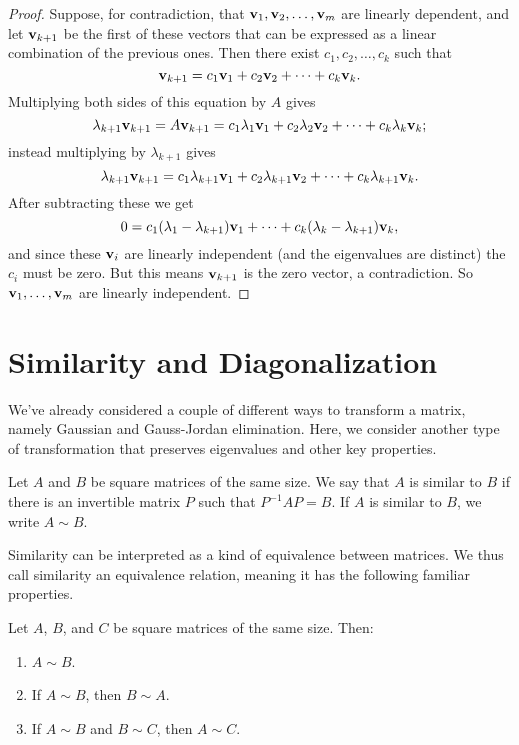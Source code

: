 \documentclass[../m073main.tex]{subfiles}
\begin{document}
\begin{proof}
	Suppose, for contradiction, that $\mathbf{v}_1, \mathbf{v}_2, \ldots, \mathbf{v}_m$ are linearly dependent, and let $\mathbf{v}_{k+1}$ be the first of these vectors that can be expressed as a linear combination of the previous ones.
	Then there exist $c_1, c_2, \ldots, c_k$ such that
	\[ \mathbf{v}_{k+1} = c_1 \mathbf{v}_1 + c_2 \mathbf{v}_2 + \cdots + c_k \mathbf{v}_k. \]
	Multiplying both sides of this equation by $A$ gives
	\[ \lambda_{k+1} \mathbf{v}_{k+1} = A \mathbf{v}_{k+1} = c_1 \lambda_1 \mathbf{v}_1 + c_2 \lambda_2 \mathbf{v}_2 + \cdots + c_k \lambda_k \mathbf{v}_k; \]
	instead multiplying by $\lambda_{k+1}$ gives
	\[ \lambda_{k+1} \mathbf{v}_{k+1} = c_1 \lambda_{k+1} \mathbf{v}_1 + c_2 \lambda_{k+1} \mathbf{v}_2 + \cdots + c_k \lambda_{k+1} \mathbf{v}_k. \]
	After subtracting these we get
	\[ 0 = c_1 (\lambda_1 - \lambda_{k+1}) \mathbf{v}_1 + \cdots + c_k (\lambda_k - \lambda_{k+1}) \mathbf{v}_k, \]
	and since these $\mathbf{v}_i$ are linearly independent (and the eigenvalues are distinct) the $c_i$ must be zero.
	But this means $\mathbf{v}_{k+1}$ is the zero vector, a contradiction.
	So $\mathbf{v}_1, \ldots, \mathbf{v}_m$ are linearly independent.
\end{proof}

\section{Similarity and Diagonalization}
We've already considered a couple of different ways to transform a matrix, namely Gaussian and Gauss-Jordan elimination.
Here, we consider another type of transformation that preserves eigenvalues and other key properties.

\begin{definition}
	Let $A$ and $B$ be square matrices of the same size.
	We say that $A$ is similar to $B$ if there is an invertible matrix $P$ such that $P^{-1}AP = B$.
	If $A$ is similar to $B$, we write $A \sim B$.
\end{definition}

Similarity can be interpreted as a kind of equivalence between matrices.
We thus call similarity an equivalence relation, meaning it has the following familiar properties.

\pagebreak

\begin{theorem}
	Let $A$, $B$, and $C$ be square matrices of the same size.
	Then:
	\begin{enumerate}[label=(\alph*)]
		\item $A \sim B$.
		\item If $A \sim B$, then $B \sim A$.
		\item If $A \sim B$ and $B \sim C$, then $A \sim C$.
	\end{enumerate}
\end{theorem}
\end{document}
